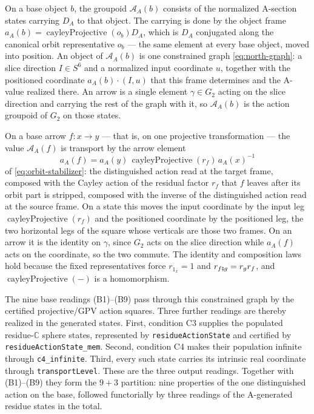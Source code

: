 \documentclass[11pt]{article}
\newcommand{\CC}{\mathbb{C}}
\theoremstyle{plain}
\theoremstyle{definition}
\theoremstyle{remark}
\begin{document}
\begin{tcolorbox}
On a base object $b$, the groupoid $\mathcal A_A(b)$ consists of the normalized
A-section states carrying $D_A$ to that object. The carrying is done by the
object frame $a_A(b)=\operatorname{cayleyProjective}(o_b)D_A$, which is $D_A$
conjugated along the canonical orbit representative $o_b$ --- the same element
at every base object, moved into position. An object of
$\mathcal A_A(b)$ is one constrained graph \eqref{eq:north-graph}: a slice
direction $I\in S^6$ and a normalized input coordinate $u$, together with the
positioned coordinate $a_A(b)\mathbin{\cdot}(I,u)$ that this frame determines
and the A-value realized there. An arrow is a single element $\gamma\in G_2$
acting on the slice direction and carrying the rest of the graph with it, so
$\mathcal A_A(b)$ is the action groupoid of $G_2$ on those states.

On a base arrow $f:x\to y$ --- that is, on one projective transformation ---
the value $\mathcal A_A(f)$ is transport by the arrow element
\[
  a_A(f)=a_A(y)\,\operatorname{cayleyProjective}(r_f)\,a_A(x)^{-1}
\]
of \eqref{eq:orbit-stabilizer}: the distinguished action read at the target
frame, composed with the Cayley action of the residual factor $r_f$ that $f$
leaves after its orbit part is stripped, composed with the inverse of the
distinguished action read at the source frame. On a state this moves the input
coordinate by the input leg $\operatorname{cayleyProjective}(r_f)$ and the
positioned coordinate by the positioned leg, the two horizontal legs of the
square whose verticals are those two frames. On an arrow it is the identity on
$\gamma$, since $G_2$ acts on the slice direction while $a_A(f)$ acts on the
coordinate, so the two commute. The identity and composition laws hold because
the fixed representatives force $r_{1_x}=1$ and
$r_{f\fatsemi g}=r_g r_f$, and $\operatorname{cayleyProjective}(-)$ is a
homomorphism.

The nine base readings \textup{(B1)--(B9)} pass through this constrained graph by the certified
projective/GPV action squares. Three further readings are thereby realized in the generated
states. First, condition \textup{C3} supplies the populated residue-$\CC$ sphere states, represented
by \texttt{residueActionState} and certified by \texttt{residueActionState\_mem}. Second,
condition \textup{C4} makes their population infinite through \texttt{c4\_infinite}. Third, every
such state carries its intrinsic real coordinate through \texttt{transportLevel}. These are the
three output readings. Together with \textup{(B1)--(B9)} they form the $9+3$ partition: nine
properties of the one distinguished action on the base, followed functorially by three readings
of the A-generated residue states in the total.


\end{tcolorbox}
\end{document}
